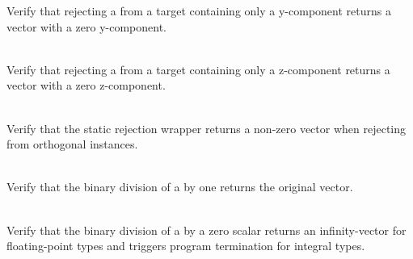 \begin{DoxyRefList}
\label{test__test000137}%
%
Verify that rejecting a  from a target  containing only a y-\/component returns a vector with a zero y-\/component.  
\item[{\parbox[t]{\linewidth}{Member \doxylink{group___f_g_m___vec4___rej_gac9be3653ba0d5052e5d4435d7b9e8918}{Vector4\+DRejection\+\_\+\+Rejection\+From\+ZAxis\+Returns\+Vector\+With\+Zero\+ZComponent} ()}}]\hfill \\
\label{test__test000138}%
%
Verify that rejecting a  from a target  containing only a z-\/component returns a vector with a zero z-\/component.  
\item[{\parbox[t]{\linewidth}{Member \doxylink{group___f_g_m___vec4___rej_ga7c89987efde21c814a27545d323ad83b}{Vector4\+DRejection\+\_\+\+Static\+Wrapper\+\_\+\+Non\+Orthogonal\+Rejection\+Returns\+Non\+Zero\+Vector} ()}}]\hfill \\
\label{test__test000142}%
%
Verify that the  static rejection wrapper returns a non-\/zero vector when rejecting from orthogonal instances.  
\item[{\parbox[t]{\linewidth}{Member \doxylink{group___f_g_m___vec4___division_gac0e1796c59ffa38ab278a0568abbf1af}{Vector4\+DScalar\+Division\+\_\+\+Division\+By\+One\+Returns\+Original\+Vector} ()}}]\hfill \\
\label{test__test000034}%
%
Verify that the binary division of a  by one returns the original vector.  
\item[{\parbox[t]{\linewidth}{Member \doxylink{group___f_g_m___vec4___division_ga0f12560dbc4cc7cb13d636ab10eacf16}{Vector4\+DScalar\+Division\+\_\+\+Division\+By\+Zero\+Returns\+Infinity\+Vector} ()}}]\hfill \\
\label{test__test000033}%
%
Verify that the binary division of a  by a zero scalar returns an infinity-\/vector for floating-\/point types and triggers program termination for integral types.  
\item[{\parbox[t]{\linewidth}{Member \doxylink{group___f_g_m___vec4___division_ga65d6353b0510aad14587bba58fc1a34f}{Vector4\+DScalar\+Division\+\_\+\+Mixed\+Type\+Scalar\+Division\+Assignment\+Does\+Not\+Promote\+Type} ()}}]\hfill \\

\end{DoxyRefList}
